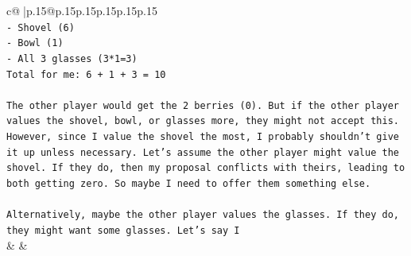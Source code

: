 \documentclass{article}
\begin{document}
{\begin{supertabular}{c@{$\;$}|p{.15\linewidth}@{}p{.15\linewidth}p{.15\linewidth}p{.15\linewidth}p{.15\linewidth}p{.15\linewidth}}
{{{\\ 
\texttt{{-} Shovel (6)} \\
\texttt{{-} Bowl (1)} \\
\texttt{{-} All 3 glasses (3*1=3)} \\
\texttt{Total for me: 6 + 1 + 3 = 10} \\
\\ 
\texttt{The other player would get the 2 berries (0). But if the other player values the shovel, bowl, or glasses more, they might not accept this. However, since I value the shovel the most, I probably shouldn't give it up unless necessary. Let's assume the other player might value the shovel. If they do, then my proposal conflicts with theirs, leading to both getting zero. So maybe I need to offer them something else.} \\
\\ 
\texttt{Alternatively, maybe the other player values the glasses. If they do, they might want some glasses. Let's say I} \\
            }
        }
    }
    & & \\ \\


\end{supertabular}}
\end{document}

